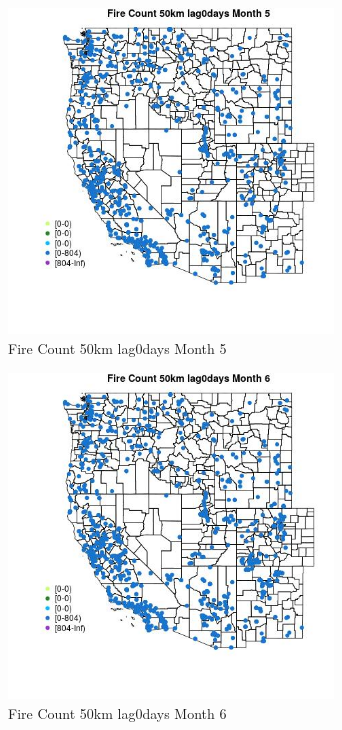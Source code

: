 \begin{figure} 
\centering  
\includegraphics[width=0.77\textwidth]{Code_Outputs/Report_ML_input_PM25_Step4_part_f_de_duplicated_aveswNAs_MapObsMo5Fire_Count_50km_lag0days.jpg} 
\caption{\label{fig:Report_ML_input_PM25_Step4_part_f_de_duplicated_aveswNAsMapObsMo5Fire_Count_50km_lag0days}Fire Count 50km lag0days Month 5} 
\end{figure} 
 

\clearpage 

\begin{figure} 
\centering  
\includegraphics[width=0.77\textwidth]{Code_Outputs/Report_ML_input_PM25_Step4_part_f_de_duplicated_aveswNAs_MapObsMo6Fire_Count_50km_lag0days.jpg} 
\caption{\label{fig:Report_ML_input_PM25_Step4_part_f_de_duplicated_aveswNAsMapObsMo6Fire_Count_50km_lag0days}Fire Count 50km lag0days Month 6} 
\end{figure} 
 

